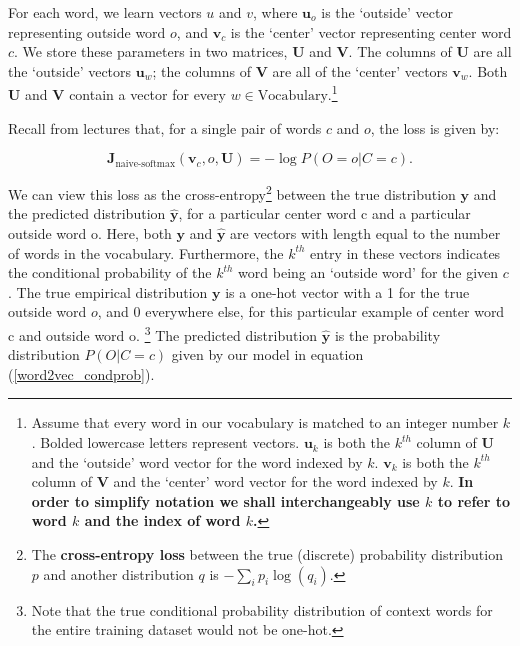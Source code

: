 \documentclass{article}
\begin{document}
For each word, we learn vectors $u$ and $v$, where $\bm u_o$ is the `outside' vector representing outside word $o$, and $\bm v_c$ is the `center' vector representing center word $c$. 
We store these parameters in two matrices, $\bm U$ and $\bm V$.
The columns of $\bm U$ are all the `outside' vectors $\bm u_{w}$;
the columns of $\bm V$ are all of the `center' vectors $\bm v_{w}$. 
Both $\bm U$ and $\bm V$ contain a vector for every $w \in \text{Vocabulary}$.\footnote{Assume that every word in our vocabulary is matched to an integer number $k$. Bolded lowercase letters represent vectors. $\bm u_{k}$ is both the $k^{th}$ column of $\bm U$ and the `outside' word vector for the word indexed by $k$. $\bm v_k$ is both the $k^{th}$ column of $\bm V$ and the `center' word vector for the word indexed by $k$. \textbf{In order to simplify notation we shall interchangeably use $k$ to refer to word $k$ and the index of word $k$.}}\newline

Recall from lectures that, for a single pair of words $c$ and $o$, the loss is given by:

\begin{equation} 
\bm J_{\text{naive-softmax}}(\bm v_c, o, \bm U) = -\log P(O=o| C=c).
\label{naive-softmax}
\end{equation}

We can view this loss as the cross-entropy\footnote{The \textbf{cross-entropy loss} between the true (discrete) probability distribution $p$ and another distribution $q$ is $-\sum_i p_i \log(q_i)$.} between the true distribution $\bm y$ and the predicted distribution $\hat{\bm y}$, for a particular center word c and a particular outside word o. 
Here, both $\bm y$ and $\hat{\bm y}$ are vectors with length equal to the number of words in the vocabulary.
Furthermore, the $k^{th}$ entry in these vectors indicates the conditional probability of the $k^{th}$ word being an `outside word' for the given $c$. 
The true empirical distribution $\bm y$ is a one-hot vector with a 1 for the true outside word $o$, and 0 everywhere else, for this particular example of center word c and outside word o. \footnote{Note that the true conditional probability distribution of context words for the entire training dataset would not be one-hot.}
The predicted distribution $\hat{\bm y}$ is the probability distribution $P(O|C=c)$ given by our model in equation (\ref{word2vec_condprob}). \newline
\end{document}
